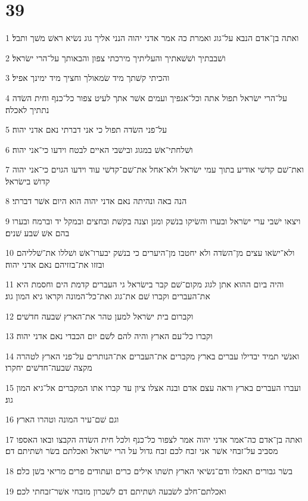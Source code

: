 \chapter{39}

\par 1 ואתה בן־אדם הנבא על־גוג ואמרת כה אמר אדני יהוה הנני אליך גוג נשׂיא ראשׁ משׁך ותבל׃
\par 2 ושׁבבתיך ושׁשׁאתיך והעליתיך מירכתי צפון והבאותך על־הרי ישׂראל׃
\par 3 והכיתי קשׁתך מיד שׂמאולך וחציך מיד ימינך אפיל׃
\par 4 על־הרי ישׂראל תפול אתה וכל־אגפיך ועמים אשׁר אתך לעיט צפור כל־כנף וחית השׂדה נתתיך לאכלה׃
\par 5 על־פני השׂדה תפול כי אני דברתי נאם אדני יהוה׃
\par 6 ושׁלחתי־אשׁ במגוג ובישׁבי האיים לבטח וידעו כי־אני יהוה׃
\par 7 ואת־שׁם קדשׁי אודיע בתוך עמי ישׂראל ולא־אחל את־שׁם־קדשׁי עוד וידעו הגוים כי־אני יהוה קדושׁ בישׂראל׃
\par 8 הנה באה ונהיתה נאם אדני יהוה הוא היום אשׁר דברתי׃
\par 9 ויצאו ישׁבי ערי ישׂראל ובערו והשׂיקו בנשׁק ומגן וצנה בקשׁת ובחצים ובמקל יד וברמח ובערו בהם אשׁ שׁבע שׁנים׃
\par 10 ולא־ישׂאו עצים מן־השׂדה ולא יחטבו מן־היערים כי בנשׁק יבערו־אשׁ ושׁללו את־שׁלליהם ובזזו את־בזזיהם נאם אדני יהוה׃
\par 11 והיה ביום ההוא אתן לגוג מקום־שׁם קבר בישׂראל גי העברים קדמת הים וחסמת היא את־העברים וקברו שׁם את־גוג ואת־כל־המונה וקראו גיא המון גוג׃
\par 12 וקברום בית ישׂראל למען טהר את־הארץ שׁבעה חדשׁים׃
\par 13 וקברו כל־עם הארץ והיה להם לשׁם יום הכבדי נאם אדני יהוה׃
\par 14 ואנשׁי תמיד יבדילו עברים בארץ מקברים את־העברים את־הנותרים על־פני הארץ לטהרה מקצה שׁבעה־חדשׁים יחקרו׃
\par 15 ועברו העברים בארץ וראה עצם אדם ובנה אצלו ציון עד קברו אתו המקברים אל־גיא המון גוג׃
\par 16 וגם שׁם־עיר המונה וטהרו הארץ׃
\par 17 ואתה בן־אדם כה־אמר אדני יהוה אמר לצפור כל־כנף ולכל חית השׂדה הקבצו ובאו האספו מסביב על־זבחי אשׁר אני זבח לכם זבח גדול על הרי ישׂראל ואכלתם בשׂר ושׁתיתם דם׃
\par 18 בשׂר גבורים תאכלו ודם־נשׂיאי הארץ תשׁתו אילים כרים ועתודים פרים מריאי בשׁן כלם׃
\par 19 ואכלתם־חלב לשׂבעה ושׁתיתם דם לשׁכרון מזבחי אשׁר־זבחתי לכם׃
